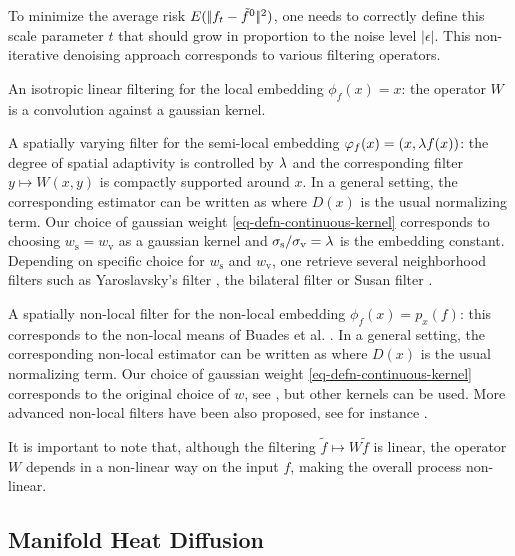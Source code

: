 \documentclass[final]{siamltex}
\newcommand{\manilift}{\phi_f}
\newcommand{\F}{f}
\newcommand{\tF}{\tilde \F}
\newcommand{\fz}{f^0}
\begin{document}
To minimize the average risk $E(\norm{\F_t-\tilde \fz}^2)$, one needs to correctly define this scale parameter $t$ that should grow in proportion to the noise level $|\epsilon|$. This non-iterative denoising approach corresponds to various filtering operators.
\begin{rs}
	\item An isotropic linear filtering for the local embedding $\manilift(x)=x$: the operator $W$ is a convolution against a gaussian kernel.
	\item A spatially varying filter for the semi-local embedding $\manilift(x)=(x,\la \F(x))$: the degree of spatial adaptivity is controlled by $\lambda$ and the corresponding filter $y \mapsto W(x,y)$ is compactly supported around $x$. In a general setting, the corresponding estimator can be written as
	\eq{
		\bar f(x) = \frac{1}{D(x)} \sum_{y} 
			w_{\text{s}}\pa{ \frac{\norm{x-y}}{\si_{\text{s}}} }
			w_{\text{v}}\pa{ \frac{\norm{\F(x)-\F(y)}}{\si_{\text{v}}} } \F(y)
	}
	where $D(x)$ is the usual normalizing term. 
	Our choice of gaussian weight \eqref{eq-defn-continuous-kernel} corresponds to choosing $w_{\text{s}} = w_{\text{v}}$ as a gaussian kernel and $\sigma_{\text{s}}/\sigma_{\text{v}} = \lambda$ is the embedding constant. Depending on specific choice for $w_{\text{s}}$ and $w_{\text{v}}$, one retrieve several neighborhood filters such as Yaroslavsky's filter \cite{yaroslavsky-book}, the bilateral filter \cite{tomasi-bilateral} or Susan filter \cite{smith-susan}.
	\item A spatially non-local filter for the non-local embedding $\manilift(x)=p_x(\F)$: this corresponds to the non-local means of Buades et al. \cite{buades-nl-means}. In a general setting, the corresponding non-local estimator can be written as
	\eq{
		\bar f(x) = \frac{1}{D(x)} \sum_{y} 
			w\pa{ \frac{\norm{p_x(\F)-p_y(\F)}}{\si} } \F(y)
	}
	where $D(x)$ is the usual normalizing term. Our choice of gaussian weight \eqref{eq-defn-continuous-kernel} corresponds to the original choice of $w$, see \cite{buades-nl-means}, but other kernels can be used. 	
	More advanced non-local filters have been also proposed, see for instance \cite{dabov-collaborative-filtering}.
\end{rs} 
It is important to note that, although the filtering $\tF \mapsto W \tF$ is linear, the operator $W$ depends in a non-linear way on the input $\F$, making the overall process non-linear.


\subsection{Manifold Heat Diffusion}
\label{sect-heat-diffusion}
\end{document}
